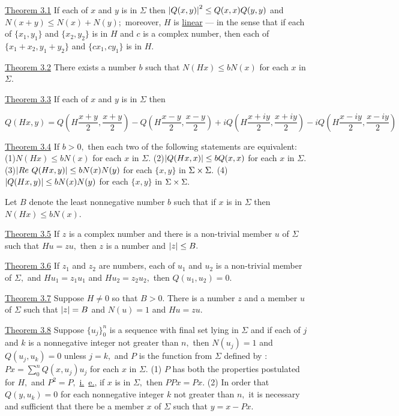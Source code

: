 \underline{Theorem 3.1}  If each of $x$ and $y$ is in $\Sigma$ then $\left|Q(x,y)\right|^{2} \leq Q(x,x)Q(y,y)$ and $N(x + y) \leq N(x) + N(y);$  moreover, $H$ is \underline{linear} --- in the sense that if each of $\{x_{1},y_{1}\}$ and $\{x_{2},y_{2}\}$ is in $H$ and $c$ is a complex number, then each of $\{x_{1} + x_{2}, y_{1} +y_{2}\}$ and $\{cx_{1}, cy_{1}\}$ is in $H.$\nl

\underline{Theorem 3.2}  There exists a number $b$ such that $N(Hx) \leq bN(x)$ for each $x$ in $\Sigma.$\nl

\underline{Theorem 3.3}  If each of $x$ and $y$ is in $\Sigma$ then\nl
\begin{small}
\[
Q(Hx,y) = Q\left(H\dfrac{x+y}{2},\dfrac{x+y}{2}\right)-Q\left(H\dfrac{x-y}{2},\dfrac{x-y}{2}\right)+iQ\left(H\dfrac{x+iy}{2},\dfrac{x+iy}{2}\right) -iQ\left(H\dfrac{x-iy}{2},\dfrac{x-iy}{2}\right)
\]
\end{small}

\underline{Theorem 3.4}  If $b > 0,$ then each two of the following statements are equivalent:\nl
\indent (1)\qquad $N(Hx) \leq bN(x)$ for each $x$ in $\Sigma.$\nl
\indent (2)\qquad $\left|Q(Hx,x)\right| \leq bQ(x,x)$ for each $x$ in $\Sigma.$\nl
\indent (3)\qquad $\left|Re~Q(Hx,y)\right| \leq bN(x)N(y)$ for each $\{x,y\}$ in $\Sigma \times \Sigma.$\nl
\indent (4)\qquad $\left|Q(Hx,y)\right| \leq bN(x)N(y)$ for each $\{x,y\}$ in $\Sigma \times \Sigma.$\nl

Let $B$ denote the least nonnegative number $b$ such that if $x$ is in $\Sigma$ then $N(Hx) \leq bN(x).$\nl

\underline{Theorem 3.5}  If $z$ is a complex number and there is a non-trivial member $u$ of $\Sigma$ such that
$Hu = zu,$ then $z$ is a number and $\left|z\right| \leq B.$ \nl

\underline{Theorem 3.6}  If $z_{1}$ and $z_{2}$ are numbers, each of $u_{1}$ and $u_{2}$ is a non-trivial member of $\Sigma,$  and $Hu_{1} = z_{1}u_{1}$ and $Hu_{2} = z_{2}u_{2},$ then $Q(u_{1}, u_{2}) = 0.$ \nl

\underline{Theorem 3.7}  Suppose $H \neq 0$ so that $B > 0.$  There is a number $z$ and a member $u$ of $\Sigma$ such that $\left|z\right| = B$ and $N(u) = 1$ and $Hu = zu.$\nl

\underline{Theorem 3.8}  Suppose $\{u_{j}\}_{0}^{n}$ is a sequence with final set lying in $\Sigma$ and if each of $j$ and $k$ is a nonnegative integer not greater than $n,$ then $N(u_{j}) = 1$ and $Q(u_{j},u_{k}) = 0$ unless $j = k,$ and $P$ is the function from $\Sigma$ defined by : $Px = \sum_{0}^{n} Q(x, u_{j})u_{j}$ for each $x$ in $\Sigma.$\nl
\indent (1) $P$ has both the properties postulated for $H,$ and $P^{2} = P,$ \underline{i.}~\underline{e.}, if $x$ is in $\Sigma,$ then $PPx = Px.$\nl
\indent (2) In order that $Q(y,u_{k}) = 0$ for each nonnegative integer $k$ not greater than $n,$ it is necessary and sufficient that there be a member $x$ of $\Sigma$ such that $y = x - Px.$\nl

